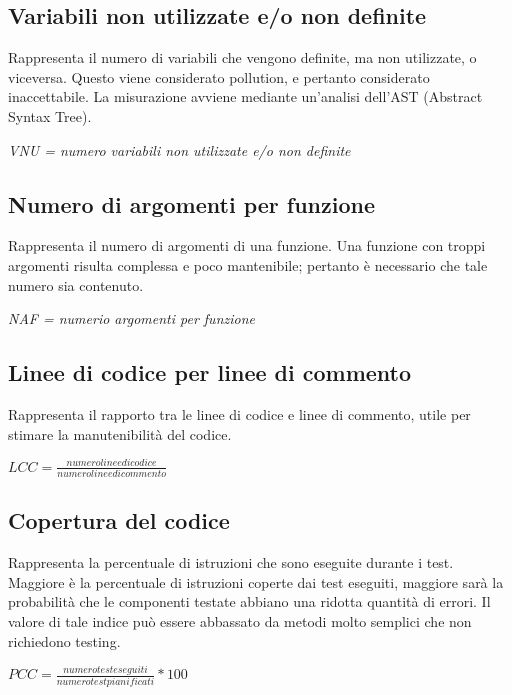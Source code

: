   \subsection{Variabili non utilizzate e/o non definite}
  Rappresenta il numero di variabili che vengono definite, ma non utilizzate, o viceversa.
  Questo viene considerato pollution, e pertanto considerato inaccettabile.
  La misurazione avviene mediante un’analisi dell’AST (Abstract Syntax Tree).
  \begin{center}
    \emph{VNU = numero variabili non utilizzate e/o non definite}
  \end{center}

  \subsection{Numero di argomenti per funzione}
  Rappresenta il numero di argomenti di una funzione. Una funzione con troppi argomenti
  risulta complessa e poco mantenibile; pertanto è necessario che tale numero sia contenuto.
  \begin{center}
    \emph{NAF = numerio argomenti per funzione}
  \end{center}

  \subsection{Linee di codice per linee di commento}
  Rappresenta il rapporto tra le linee di codice e linee di commento, utile per stimare la manutenibilità del codice.
  \begin{center}
    \( LCC = \frac{numero linee di codice}{numero linee di commento} \)
  \end{center}

  \subsection{Copertura del codice}
  Rappresenta la percentuale di istruzioni che sono eseguite durante i test. Maggiore è la percentuale di istruzioni coperte dai test eseguiti, maggiore sarà la probabilità
  che le componenti testate abbiano una ridotta quantità di errori. Il valore di tale indice può essere abbassato da metodi molto semplici che non richiedono testing.
  \begin{center}
    \( PCC = {\frac{numero test eseguiti}{numero test pianificati}}*100 \)
  \end{center}
